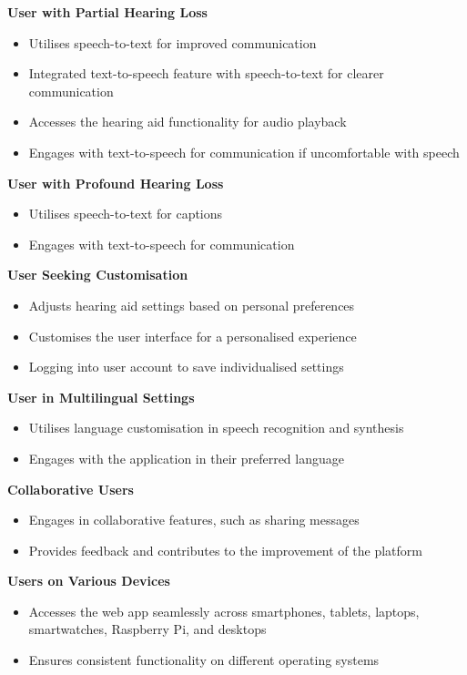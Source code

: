 \documentclass{l4proj}
\begin{document}
\textbf{User with Partial Hearing Loss}
\begin{itemize}
    \item Utilises speech-to-text for improved communication
    \item Integrated text-to-speech feature with speech-to-text for clearer communication
    \item Accesses the hearing aid functionality for audio playback
    \item Engages with text-to-speech for communication if uncomfortable with speech
\end{itemize}

\textbf{User with Profound Hearing Loss}
\begin{itemize}
    \item Utilises speech-to-text for captions
    \item Engages with text-to-speech for communication
\end{itemize}

\textbf{User Seeking Customisation}
\begin{itemize}
    \item Adjusts hearing aid settings based on personal preferences
    \item Customises the user interface for a personalised experience
    \item Logging into user account to save individualised settings
\end{itemize}

\textbf{User in Multilingual Settings}
\begin{itemize}
    \item Utilises language customisation in speech recognition and synthesis
    \item Engages with the application in their preferred language
\end{itemize}

\textbf{Collaborative Users}
\begin{itemize}
    \item Engages in collaborative features, such as sharing messages
    \item Provides feedback and contributes to the improvement of the platform
\end{itemize}

\textbf{Users on Various Devices}
\begin{itemize}
    \item Accesses the web app seamlessly across smartphones, tablets, laptops, smartwatches, Raspberry Pi, and desktops
    \item Ensures consistent functionality on different operating systems
\end{itemize}
\end{document}
